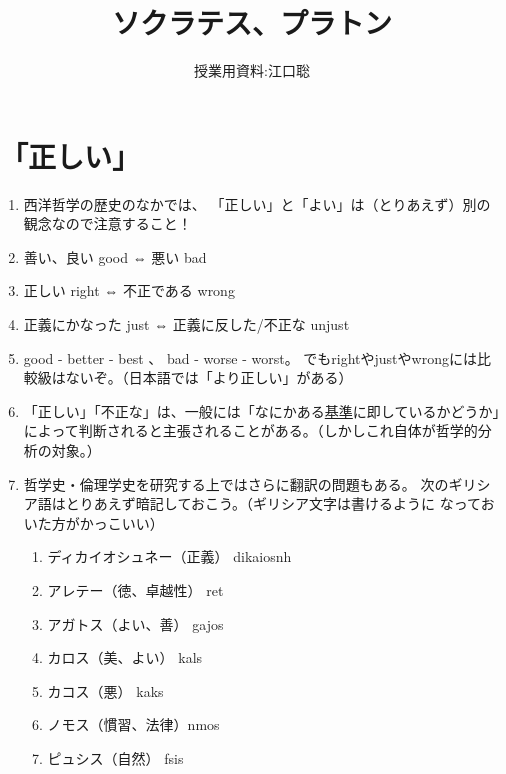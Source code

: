 \documentclass{jsarticle}
\author{授業用資料:江口聡}
\title{ソクラテス、プラトン}
\begin{document}
\maketitle

\section{「正しい」}

\begin{enumerate}

\item 西洋哲学の歴史のなかでは、
「正しい」と「よい」は（とりあえず）別の観念なので注意すること！
  
\item 善い、良い good ⇔ 悪い bad

\item 正しい right ⇔ 不正である wrong 
\item 正義にかなった just  ⇔ 正義に反した/不正な unjust

\item good - better - best 、 bad - worse - worst。
でもrightやjustやwrongには比較級はないぞ。（日本語では「より正しい」がある）

\item 「正しい」「不正な」は、一般には「なにかある\underline{基準}に即しているかどうか」によって判断されると主張されることがある。（しかしこれ自体が哲学的分析の対象。）

\item 哲学史・倫理学史を研究する上ではさらに翻訳の問題もある。
次のギリシア語はとりあえず暗記しておこう。（ギリシア文字は書けるように
なっておいた方がかっこいい）

 \begin{enumerate}
 \item ディカイオシュネー（正義） \textgreek{dikaios\ua{}nh} 
 \item アレテー（徳、卓越性） \textgreek{\as{}ret\ha{}} 
 \item アガトス（よい、善） \textgreek{\as{}gajos} 
 \item カロス（美、よい） \textgreek{kal{\oa}s}
 \item カコス（悪） \textgreek{kak\oa{}s} 
 \item ノモス（慣習、法律）\textgreek{n{\oa}mos} 
 \item ピュシス（自然） \textgreek{f{\ua}sis}
 \end{enumerate}




\end{enumerate}
\end{document}
